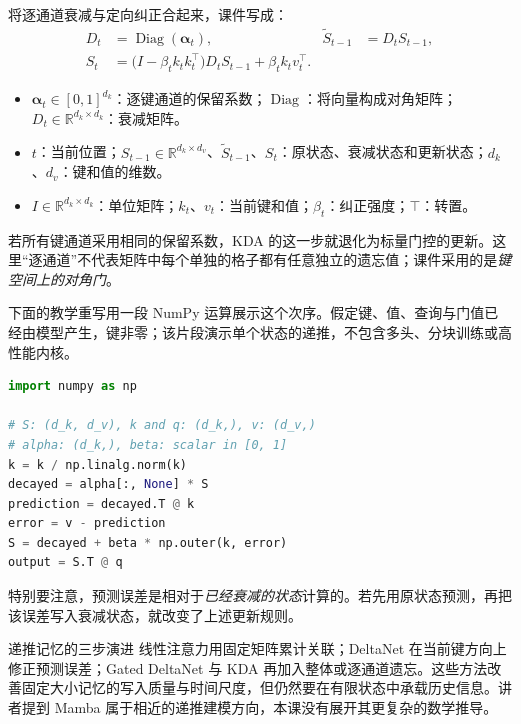\documentclass[11pt,a4paper]{article}
\begin{document}
将逐通道衰减与定向纠正合起来，课件写成：
$$
\begin{aligned}
D_t&=\operatorname{Diag}(\boldsymbol\alpha_t),
&\widetilde S_{t-1}&=D_tS_{t-1},\\
S_t&=\bigl(I-\beta_t k_tk_t^{\top}\bigr)D_tS_{t-1}
+\beta_t k_tv_t^{\top}.
\end{aligned}
$$
\begin{itemize}
  \item $\boldsymbol\alpha_t\in[0,1]^{d_k}$：逐键通道的保留系数；$\operatorname{Diag}$：将向量构成对角矩阵；$D_t\in\mathbb R^{d_k\times d_k}$：衰减矩阵。
  \item $t$：当前位置；$S_{t-1}\in\mathbb R^{d_k\times d_v}$、$\widetilde S_{t-1}$、$S_t$：原状态、衰减状态和更新状态；$d_k$、$d_v$：键和值的维数。
  \item $I\in\mathbb R^{d_k\times d_k}$：单位矩阵；$k_t$、$v_t$：当前键和值；$\beta_t$：纠正强度；$\top$：转置。
\end{itemize}

若所有键通道采用相同的保留系数，KDA 的这一步就退化为标量门控的更新。这里“逐通道”不代表矩阵中每个单独的格子都有任意独立的遗忘值；课件采用的是\emph{键空间上的对角门}。

下面的教学重写用一段 NumPy 运算展示这个次序。假定键、值、查询与门值已经由模型产生，键非零；该片段演示单个状态的递推，不包含多头、分块训练或高性能内核。

\noindent\begin{minipage}{\textwidth}
\begin{lstlisting}[language=Python,caption={教学重写：逐通道衰减后，再按预测误差更新状态}]
import numpy as np

# S: (d_k, d_v), k and q: (d_k,), v: (d_v,)
# alpha: (d_k,), beta: scalar in [0, 1]
k = k / np.linalg.norm(k)
decayed = alpha[:, None] * S
prediction = decayed.T @ k
error = v - prediction
S = decayed + beta * np.outer(k, error)
output = S.T @ q
\end{lstlisting}
\end{minipage}

特别要注意，预测误差是相对于\emph{已经衰减的状态}计算的。若先用原状态预测，再把该误差写入衰减状态，就改变了上述更新规则。

\begin{importantbox}{递推记忆的三步演进}
线性注意力用固定矩阵累计关联；DeltaNet 在当前键方向上修正预测误差；Gated DeltaNet 与 KDA 再加入整体或逐通道遗忘。这些方法改善固定大小记忆的写入质量与时间尺度，但仍然要在有限状态中承载历史信息。讲者提到 Mamba 属于相近的递推建模方向，本课没有展开其更复杂的数学推导。
\end{importantbox}
\end{document}
